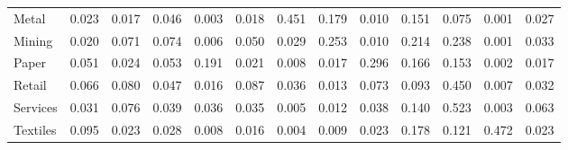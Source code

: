 \begin{table}[htbp]
\begin{tabular}{lcccccccccccc}
  Metal & \textcolor[RGB]{154,100,101}{0.023} & \textcolor[RGB]{182,118,73}{0.017} & \textcolor[RGB]{108,70,147}{0.046} & \textcolor[RGB]{243,157,12}{0.003} & \textcolor[RGB]{175,113,80}{0.018} & \textcolor[RGB]{5,3,250}{0.451} & \textcolor[RGB]{32,21,223}{0.179} & \textcolor[RGB]{207,134,48}{0.010} & \textcolor[RGB]{42,27,212}{0.151} & \textcolor[RGB]{78,50,177}{0.075} & \textcolor[RGB]{251,163,4}{0.001} & \textcolor[RGB]{145,94,110}{0.027} \\ 
  Mining & \textcolor[RGB]{170,110,85}{0.020} & \textcolor[RGB]{85,55,170}{0.071} & \textcolor[RGB]{80,52,175}{0.074} & \textcolor[RGB]{225,146,30}{0.006} & \textcolor[RGB]{101,65,154}{0.050} & \textcolor[RGB]{138,89,117}{0.029} & \textcolor[RGB]{18,11,237}{0.253} & \textcolor[RGB]{205,133,50}{0.010} & \textcolor[RGB]{23,15,232}{0.214} & \textcolor[RGB]{19,13,236}{0.238} & \textcolor[RGB]{248,160,7}{0.001} & \textcolor[RGB]{129,84,126}{0.033} \\ 
  Paper & \textcolor[RGB]{99,64,156}{0.051} & \textcolor[RGB]{151,97,104}{0.024} & \textcolor[RGB]{97,63,158}{0.053} & \textcolor[RGB]{27,17,228}{0.191} & \textcolor[RGB]{161,104,94}{0.021} & \textcolor[RGB]{214,139,41}{0.008} & \textcolor[RGB]{179,116,76}{0.017} & \textcolor[RGB]{16,10,239}{0.296} & \textcolor[RGB]{35,23,220}{0.166} & \textcolor[RGB]{41,26,214}{0.153} & \textcolor[RGB]{246,159,9}{0.002} & \textcolor[RGB]{177,115,78}{0.017} \\ 
  Retail & \textcolor[RGB]{87,56,168}{0.066} & \textcolor[RGB]{73,47,182}{0.080} & \textcolor[RGB]{106,69,149}{0.047} & \textcolor[RGB]{186,120,69}{0.016} & \textcolor[RGB]{69,45,186}{0.087} & \textcolor[RGB]{124,80,131}{0.036} & \textcolor[RGB]{193,125,62}{0.013} & \textcolor[RGB]{81,53,174}{0.073} & \textcolor[RGB]{67,44,188}{0.093} & \textcolor[RGB]{7,5,248}{0.450} & \textcolor[RGB]{218,141,37}{0.007} & \textcolor[RGB]{133,86,122}{0.032} \\ 
  Services & \textcolor[RGB]{135,87,120}{0.031} & \textcolor[RGB]{76,49,179}{0.076} & \textcolor[RGB]{117,76,138}{0.039} & \textcolor[RGB]{120,78,135}{0.036} & \textcolor[RGB]{126,81,129}{0.035} & \textcolor[RGB]{230,149,25}{0.005} & \textcolor[RGB]{198,128,57}{0.012} & \textcolor[RGB]{119,77,136}{0.038} & \textcolor[RGB]{48,31,207}{0.140} & \textcolor[RGB]{2,1,253}{0.523} & \textcolor[RGB]{239,155,16}{0.003} & \textcolor[RGB]{89,57,166}{0.063} \\ 
  Textiles & \textcolor[RGB]{66,42,189}{0.095} & \textcolor[RGB]{159,103,96}{0.023} & \textcolor[RGB]{143,93,112}{0.028} & \textcolor[RGB]{216,140,39}{0.008} & \textcolor[RGB]{184,119,71}{0.016} & \textcolor[RGB]{232,150,23}{0.004} & \textcolor[RGB]{212,138,42}{0.009} & \textcolor[RGB]{158,102,97}{0.023} & \textcolor[RGB]{34,22,221}{0.178} & \textcolor[RGB]{57,37,198}{0.121} & \textcolor[RGB]{4,2,251}{0.472} & \textcolor[RGB]{156,101,99}{0.023} \\ 

\end{tabular}
\end{table}
